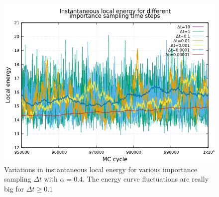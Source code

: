 



\begin{figure}[H]
\centering
\includegraphics[scale = 0.75]{figures/importance_sampling_dt}
\caption{Variations in instantaneous local energy for various importance sampling $\Delta t$ with $\alpha = 0.4$. The energy curve fluctuations are really big for $\Delta t \geq 0.1$}
\label{fig_imp_samp}
\end{figure}





